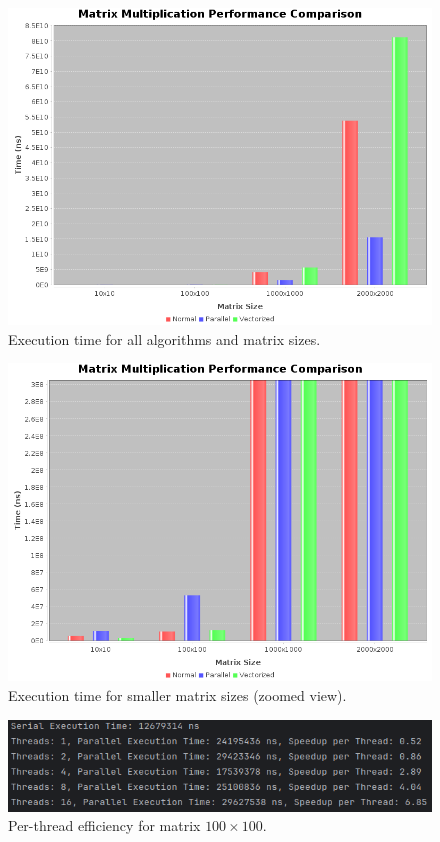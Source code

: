\documentclass[a4paper,12pt]{article}
\begin{document}
\begin{figure}[H]
    \centering
    \includegraphics[width=\textwidth]{CompareTimeBig.png}
    \caption{Execution time for all algorithms and matrix sizes.}
    \label{fig:time_full}
\end{figure}

\begin{figure}[H]
    \centering
    \includegraphics[width=\textwidth]{CompareTimeSmall.png}
    \caption{Execution time for smaller matrix sizes (zoomed view).}
    \label{fig:time_zoomed}
\end{figure}

\begin{figure}[H]
    \centering
    \includegraphics[width=\textwidth]{ThreadSpeedUpTest100.png}
    \caption{Per-thread efficiency for matrix $100 \times 100$.}
    \label{fig:speedup_100}
\end{figure}
\end{document}
